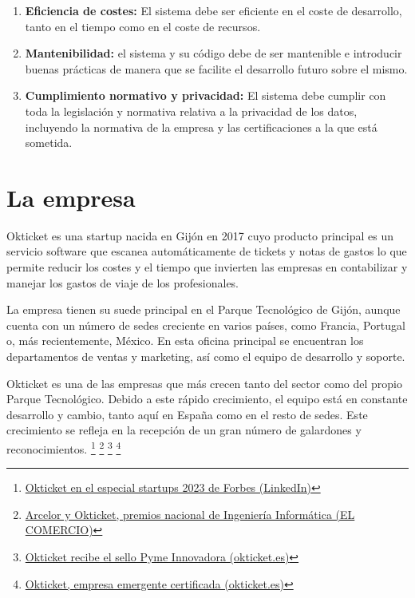 \begin{enumerate}[label=RNF\arabic*.]
\begin{enumerate}[label*=\arabic*.]
	\end{enumerate}
	\item \textbf{Eficiencia de costes:} El sistema debe ser eficiente en el coste de desarrollo, tanto en el tiempo como en el coste de
		recursos.
	\item \textbf{Mantenibilidad:} el sistema y su código debe de ser mantenible e introducir buenas prácticas de manera
		que se facilite el desarrollo futuro sobre el mismo.
	\item \textbf{Cumplimiento normativo y privacidad:} El sistema debe cumplir con toda la legislación y normativa
		relativa a la privacidad de los datos, incluyendo la normativa de la empresa y las certificaciones a la que
		está sometida.
\end{enumerate}

\newpage{}
\section{La empresa}\label{sec:empresa}
Okticket es una startup nacida en Gijón en 2017 cuyo producto principal es un servicio software que escanea
automáticamente de tickets y notas de gastos lo que permite reducir los costes y el tiempo que invierten
las empresas en contabilizar y manejar los gastos de viaje de los profesionales.

La empresa tienen su suede principal en el Parque Tecnológico de Gijón, aunque cuenta con un número
de sedes creciente en varios países, como Francia, Portugal o, más recientemente, México. En esta
oficina principal se encuentran los departamentos de ventas y marketing, así como el equipo de
desarrollo y soporte.

Okticket es una de las empresas que más crecen tanto del sector como del propio Parque
Tecnológico. Debido a este rápido crecimiento, el equipo está en constante desarrollo y
cambio, tanto aquí en España como en el resto de sedes. Este crecimiento se refleja
en la recepción de un gran número de galardones y reconocimientos.
\footnote{\href{https://www.linkedin.com/posts/okticket_okticket-en-el-especial-startups-de-forbes-activity-7140622980618903552-UGWK}{Okticket en el especial startups 2023 de Forbes (LinkedIn)}}
\footnote{\href{https://www.elcomercio.es/economia/arcelor-okticket-premios-20230222002438-ntvo.html}{Arcelor y Okticket, premios nacional de Ingeniería Informática (EL COMERCIO)}}
\footnote{\href{https://www.okticket.es/blog/empresa-pyme-innovadora}{Okticket recibe el sello Pyme Innovadora (okticket.es)}}
\footnote{\href{https://www.okticket.es/blog/okticket-empresa-emergente-certificada}{Okticket, empresa emergente certificada (okticket.es)}}

